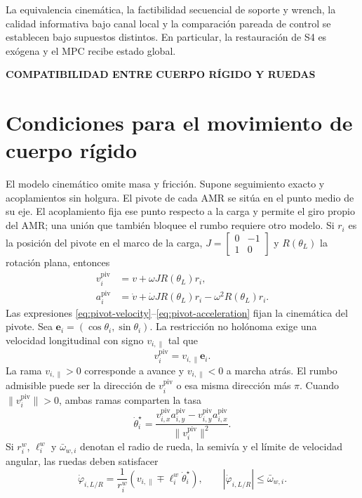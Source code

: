 \documentclass[12pt,a4paper]{article}
\newcommand{\leveltag}[1]{%
  \Needspace{5.5\baselineskip}%
  \noindent\colorbox{VIUDark}{%
    \parbox{\dimexpr\textwidth-2\fboxsep\relax}{%
      \color{white}\sffamily\bfseries\small #1%
    }%
  }\par\smallskip
}
\begin{document}
La equivalencia cinemática, la factibilidad secuencial de soporte y wrench, la
calidad informativa bajo canal local y la comparación pareada de control se
establecen bajo supuestos distintos. En
particular, la restauración de S4 es exógena y el MPC recibe estado global.

\leveltag{COMPATIBILIDAD ENTRE CUERPO RÍGIDO Y RUEDAS}
\section*{Condiciones para el movimiento de cuerpo rígido}

El modelo cinemático omite masa y fricción. Supone seguimiento exacto y
acoplamientos sin holgura. El pivote de cada AMR se sitúa en el punto medio de su eje. El
acoplamiento fija ese punto respecto a la carga y permite el giro propio del
AMR; una unión que también bloquee el rumbo requiere otro modelo. Si $r_i$ es
la posición del pivote en el marco de la carga,
$J=\left[\begin{smallmatrix}0&-1\\1&0\end{smallmatrix}\right]$ y
$R(\theta_L)$ la rotación plana, entonces
\begin{align}
v_i^{\mathrm{piv}}&=v+\omega J R(\theta_L)r_i,
\label{eq:pivot-velocity}\\
a_i^{\mathrm{piv}}&=\dot v+\dot\omega J R(\theta_L)r_i
-\omega^2R(\theta_L)r_i.
\label{eq:pivot-acceleration}
\end{align}
Las expresiones \eqref{eq:pivot-velocity}--\eqref{eq:pivot-acceleration} fijan
la cinemática del pivote. Sea
$\mathbf e_i=(\cos\theta_i,\sin\theta_i)$. La restricción no holónoma exige
una velocidad longitudinal con signo $v_{i,\parallel}$ tal que
\begin{equation}
v_i^{\mathrm{piv}}=v_{i,\parallel}\mathbf e_i.
\label{eq:heading-alignment}
\end{equation}
La rama $v_{i,\parallel}>0$ corresponde a avance y
$v_{i,\parallel}<0$ a marcha atrás. El rumbo
admisible puede ser la dirección de $v_i^{\mathrm{piv}}$ o esa misma dirección
más $\pi$. Cuando $\|v_i^{\mathrm{piv}}\|>0$, ambas ramas comparten la tasa
\begin{equation}
\dot\theta_i^\star=
\frac{v_{i,x}^{\mathrm{piv}}a_{i,y}^{\mathrm{piv}}-
v_{i,y}^{\mathrm{piv}}a_{i,x}^{\mathrm{piv}}}
{\|v_i^{\mathrm{piv}}\|^2}.
\label{eq:heading-rate}
\end{equation}
Si $r_i^w$, $\ell_i^w$ y $\bar\omega_{w,i}$ denotan el radio de rueda, la
semivía y el límite de velocidad angular, las ruedas deben satisfacer
\begin{equation}
\dot\varphi_{i,L/R}=\frac{1}{r_i^w}
\left(v_{i,\parallel}\mp\ell_i^w\dot\theta_i^\star\right),
\qquad |\dot\varphi_{i,L/R}|\leq\bar\omega_{w,i}.
\label{eq:wheel-speeds}
\end{equation}
\end{document}
